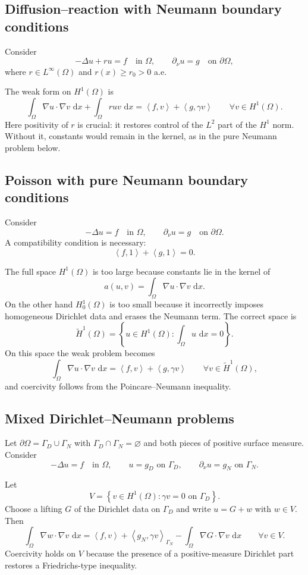 \documentclass[11pt]{article}
\theoremstyle{definition}
\newcommand{\grad}{\nabla}
\newcommand{\dd}{\,\mathrm{d}}
\newcommand{\ip}[2]{\left\langle #1,#2\right\rangle}
\newcommand{\set}[1]{\left\{ #1\right\}}
\newcommand{\eH}{\widetilde{H}}
\begin{document}
\subsection{Diffusion--reaction with Neumann boundary conditions}

Consider
\[
-\Delta u + ru = f \quad \text{in } \Omega,
\qquad \partial_\nu u = g \quad \text{on } \partial\Omega,
\]
where $r\in L^\infty(\Omega)$ and $r(x)\ge r_0>0$ a.e.

The weak form on $H^1(\Omega)$ is
\[
\int_\Omega \grad u\cdot\grad v\,\dd x + \int_\Omega ruv\,\dd x
= \ip{f}{v} + \ip{g}{\gamma v}
\qquad \forall v\in H^1(\Omega).
\]
Here positivity of $r$ is crucial: it restores control of the $L^2$ part of the $H^1$ norm. Without it, constants would remain in the kernel, as in the pure Neumann problem below.

\subsection{Poisson with pure Neumann boundary conditions}

Consider
\[
-\Delta u = f \quad \text{in } \Omega,
\qquad \partial_\nu u = g \quad \text{on } \partial\Omega.
\]
A compatibility condition is necessary:
\[
\ip{f}{1} + \ip{g}{1} = 0.
\]

The full space $H^1(\Omega)$ is too large because constants lie in the kernel of
\[
a(u,v)=\int_\Omega \grad u\cdot\grad v\,\dd x.
\]
On the other hand $H_0^1(\Omega)$ is too small because it incorrectly imposes homogeneous Dirichlet data and erases the Neumann term. The correct space is
\[
\eH^1(\Omega)=\set{u\in H^1(\Omega): \int_\Omega u\,\dd x=0}.
\]
On this space the weak problem becomes
\[
\int_\Omega \grad u\cdot\grad v\,\dd x = \ip{f}{v}+\ip{g}{\gamma v}
\qquad \forall v\in \eH^1(\Omega),
\]
and coercivity follows from the Poincare--Neumann inequality.

\subsection{Mixed Dirichlet--Neumann problems}

Let $\partial\Omega = \Gamma_D\cup \Gamma_N$ with $\Gamma_D\cap\Gamma_N=\varnothing$ and both pieces of positive surface measure. Consider
\[
-\Delta u=f \quad \text{in } \Omega,
\qquad u=g_D \text{ on } \Gamma_D,
\qquad \partial_\nu u = g_N \text{ on } \Gamma_N.
\]

Let
\[
V = \set{v\in H^1(\Omega): \gamma v=0 \text{ on } \Gamma_D}.
\]
Choose a lifting $G$ of the Dirichlet data on $\Gamma_D$ and write $u=G+w$ with $w\in V$. Then
\[
\int_\Omega \grad w\cdot\grad v\,\dd x
= \ip{f}{v} + \ip{g_N}{\gamma v}_{\Gamma_N} - \int_\Omega \grad G\cdot\grad v\,\dd x
\qquad \forall v\in V.
\]
Coercivity holds on $V$ because the presence of a positive-measure Dirichlet part restores a Friedrichs-type inequality.
\end{document}
